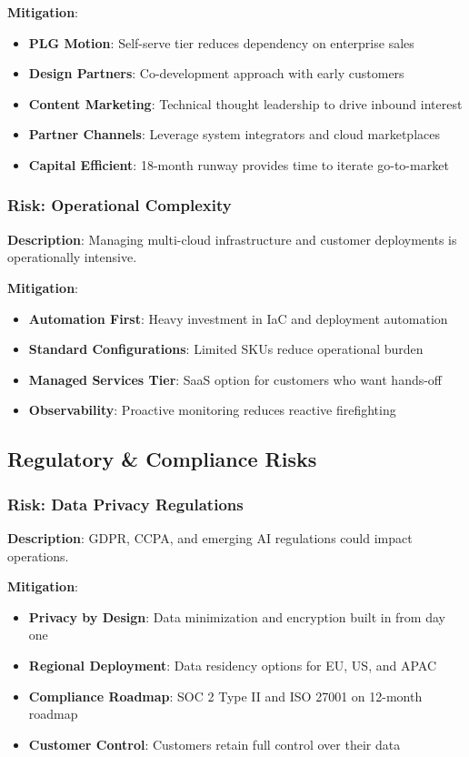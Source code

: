 \textbf{Mitigation}:
\begin{itemize}
    \item \textbf{PLG Motion}: Self-serve tier reduces dependency on enterprise sales
    \item \textbf{Design Partners}: Co-development approach with early customers
    \item \textbf{Content Marketing}: Technical thought leadership to drive inbound interest
    \item \textbf{Partner Channels}: Leverage system integrators and cloud marketplaces
    \item \textbf{Capital Efficient}: 18-month runway provides time to iterate go-to-market
\end{itemize}

\subsubsection{Risk: Operational Complexity}
\textbf{Description}: Managing multi-cloud infrastructure and customer deployments is operationally intensive.

\textbf{Mitigation}:
\begin{itemize}
    \item \textbf{Automation First}: Heavy investment in IaC and deployment automation
    \item \textbf{Standard Configurations}: Limited SKUs reduce operational burden
    \item \textbf{Managed Services Tier}: SaaS option for customers who want hands-off
    \item \textbf{Observability}: Proactive monitoring reduces reactive firefighting
\end{itemize}

\subsection{Regulatory \& Compliance Risks}

\subsubsection{Risk: Data Privacy Regulations}
\textbf{Description}: GDPR, CCPA, and emerging AI regulations could impact operations.

\textbf{Mitigation}:
\begin{itemize}
    \item \textbf{Privacy by Design}: Data minimization and encryption built in from day one
    \item \textbf{Regional Deployment}: Data residency options for EU, US, and APAC
    \item \textbf{Compliance Roadmap}: SOC 2 Type II and ISO 27001 on 12-month roadmap
    \item \textbf{Customer Control}: Customers retain full control over their data
\end{itemize}

